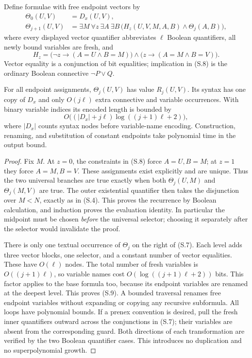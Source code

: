 Define formulae with free endpoint vectors by
\[
 \begin{split}
 \Theta_0(U,V)&=D_x(U,V),\\
 \Theta_{j+1}(U,V)
 &=\exists M\ \forall z\ \exists A\ \exists B\,
       \bigl(H_z(U,V,M,A,B)\wedge\Theta_j(A,B)\bigr),
 \end{split}                                               \tag{S.7}
\]
where every displayed vector quantifier abbreviates $\ell$ Boolean
quantifiers, all newly bound variables are fresh, and
\[
 H_z=\bigl(\neg z\to(A=U\wedge B=M)\bigr)\wedge
        \bigl(z\to(A=M\wedge B=V)\bigr).
 \tag{S.8}
\]
Vector equality is a conjunction of bit equalities; implication in
(S.8) is the ordinary Boolean connective $\neg P\vee Q$.

\begin{theorem}
\label{thm:S11}
For all endpoint assignments, $\Theta_j(U,V)$ has value $R_j(U,V)$.
Its syntax has one copy of $D_x$ and only $O(j\ell)$ extra connective
and variable occurrences.  With binary variable indices its encoded
length is bounded by
\[
 O\bigl((|D_x|+j\ell)\log((j+1)\ell+2)\bigr),
 \tag{S.9}
\]
where $|D_x|$ counts syntax nodes before variable-name encoding.  Construction,
renaming, and substitution of constant endpoints take polynomial time
in the output bound.
\end{theorem}
\begin{proof}
Fix $M$.  At $z=0$, the constraints in (S.8) force $A=U,B=M$;
at $z=1$ they force $A=M,B=V$.  These assignments exist explicitly
and are unique.  Thus the two universal branches are true exactly
when both $\Theta_j(U,M)$ and $\Theta_j(M,V)$ are true.
The outer existential quantifier then takes the disjunction over
$M<N$, exactly as in (S.4).  This proves the recurrence by Boolean
calculation, and induction proves the evaluation identity.  In
particular the midpoint must be chosen \emph{before} the universal
selector; choosing it separately after the selector would invalidate
the proof.

There is only one textual occurrence of $\Theta_j$ on the right of
(S.7).  Each level adds three vector blocks, one selector, and a
constant number of vector equalities.  These have $O(\ell)$ nodes.
The total number of fresh variables is $O((j+1)\ell)$, so variable names
cost $O(\log((j+1)\ell+2))$ bits.  This factor applies to the base
formula too, because its endpoint variables are renamed at the deepest
level.  This proves (S.9).
A bounded traversal renames free endpoint variables without expanding
or copying any recursive subformula.  All loops have polynomial bounds.
If a prenex convention is desired, pull the fresh inner quantifiers
outward across the conjunctions in (S.7); their variables are absent
from the corresponding guard.  Both directions of each transformation
are verified by the two Boolean quantifier cases.  This introduces no
duplication and no superpolynomial growth.
\end{proof}

